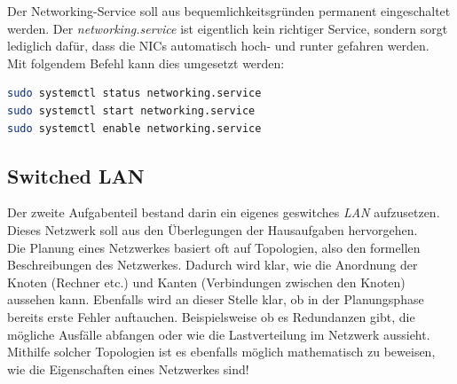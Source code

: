 \documentclass[paper=a4,fontsize=11pt]{scrartcl}%
\numberwithin{equation}{section}
\begin{document}
Der Networking-Service soll aus bequemlichkeitsgründen permanent eingeschaltet werden. Der \emph{networking.service} ist eigentlich kein richtiger Service, sondern sorgt lediglich dafür, dass die \ac{NIC}s automatisch hoch- und runter gefahren werden.\\
Mit folgendem Befehl kann dies umgesetzt werden:
\begin{lstlisting}[style=Bash, language=Bash]
sudo systemctl status networking.service
sudo systemctl start networking.service
sudo systemctl enable networking.service
\end{lstlisting}

\subsection{Switched LAN}\label{switched_lan}
Der zweite Aufgabenteil bestand darin ein eigenes geswitches \emph{LAN} aufzusetzen. Dieses Netzwerk soll aus den Überlegungen der Hausaufgaben hervorgehen.\\
Die Planung eines Netzwerkes basiert oft auf Topologien, also den formellen Beschreibungen des Netzwerkes. Dadurch wird klar, wie die Anordnung der Knoten (Rechner etc.) und Kanten (Verbindungen zwischen den Knoten) aussehen kann. Ebenfalls wird an dieser Stelle klar, ob in der Planungsphase bereits erste Fehler auftauchen. Beispielsweise ob es Redundanzen gibt, die mögliche Ausfälle abfangen oder wie die Lastverteilung im Netzwerk aussieht.\\
Mithilfe solcher Topologien ist es ebenfalls möglich mathematisch zu beweisen, wie die Eigenschaften eines Netzwerkes sind!\\
\end{document}
